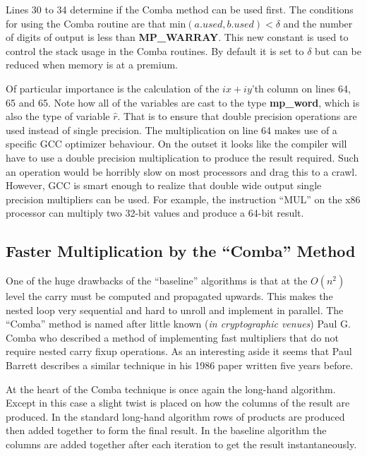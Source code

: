 \documentclass[b5paper]{book}
\begin{document}
Lines 30 to 34 determine if the Comba method can be used first.  The conditions for using the Comba routine are that min$(a.used, b.used) < \delta$ and
the number of digits of output is less than \textbf{MP\_WARRAY}.  This new constant is used to control 
the stack usage in the Comba routines.  By default it is set to $\delta$ but can be reduced when memory is at a premium.

Of particular importance is the calculation of the $ix+iy$'th column on lines 64, 65 and 65.  Note how all of the
variables are cast to the type \textbf{mp\_word}, which is also the type of variable $\hat r$.  That is to ensure that double precision operations 
are used instead of single precision.  The multiplication on line 64 makes use of a specific GCC optimizer behaviour.  On the outset it looks like 
the compiler will have to use a double precision multiplication to produce the result required.  Such an operation would be horribly slow on most 
processors and drag this to a crawl.  However, GCC is smart enough to realize that double wide output single precision multipliers can be used.  For 
example, the instruction ``MUL'' on the x86 processor can multiply two 32-bit values and produce a 64-bit result.  

\subsection{Faster Multiplication by the ``Comba'' Method}

One of the huge drawbacks of the ``baseline'' algorithms is that at the $O(n^2)$ level the carry must be computed and propagated upwards.  This
makes the nested loop very sequential and hard to unroll and implement in parallel.  The ``Comba'' \cite{COMBA} method is named after little known 
(\textit{in cryptographic venues}) Paul G. Comba who described a method of implementing fast multipliers that do not require nested 
carry fixup operations.  As an interesting aside it seems that Paul Barrett describes a similar technique in
his 1986 paper \cite{BARRETT} written five years before.

At the heart of the Comba technique is once again the long-hand algorithm.  Except in this case a slight twist is placed on how
the columns of the result are produced.  In the standard long-hand algorithm rows of products are produced then added together to form the 
final result.  In the baseline algorithm the columns are added together after each iteration to get the result instantaneously.  
\end{document}

